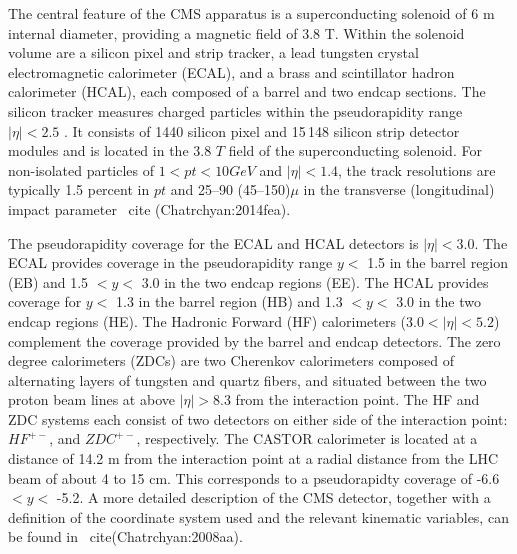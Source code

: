 The central feature of the CMS apparatus is a superconducting solenoid of 6 m internal diameter, providing a magnetic field of 3.8 T. Within the solenoid volume are a silicon pixel and strip tracker, a lead tungsten crystal electromagnetic calorimeter (ECAL), and a brass and scintillator hadron calorimeter (HCAL), each composed of a barrel and two endcap sections. The silicon tracker measures charged particles within the pseudorapidity range $|\eta| < 2.5$ . It consists of 1440 silicon pixel and 15\,148 silicon strip detector modules and is located in the 3.8 $T$ field of the superconducting solenoid. For non-isolated particles of $1 < pt < 10 GeV$ and $|\eta| < 1.4$, the track resolutions are typically 1.5 percent in $pt$ and 25--90 (45--150)$\mu$ in the transverse (longitudinal) impact parameter~ cite (Chatrchyan:2014fea). 


The pseudorapidity coverage for the ECAL and HCAL detectors is $|\eta|< 3.0$. The ECAL provides coverage in the pseudorapidity range $y < $ 1.5 in the barrel region (EB) and 1.5 $< y <$ 3.0 in the two endcap regions (EE). The HCAL provides coverage for $y <$ 1.3 in the barrel region (HB) and 1.3 $< y< $ 3.0 in the two endcap regions (HE). The Hadronic Forward (HF) calorimeters ($3.0<|\eta| < 5.2 $) complement the coverage provided by the barrel and endcap detectors. The zero degree calorimeters (ZDCs) are two Cherenkov calorimeters composed of alternating layers of tungsten and quartz fibers, and situated between the two proton beam lines at above $|\eta|>8.3$ from the interaction point. The HF and ZDC systems each consist of two detectors on either side of the interaction point: $HF^{+-}$, and $ZDC^{+-}$, respectively. The CASTOR calorimeter is located at a distance of 14.2 m from the interaction point at a radial distance from the LHC beam of about 4 to 15 cm. This corresponds to a pseudorapidty coverage of -6.6 $< y <$ -5.2. A more detailed description of the CMS detector, together with a definition of the coordinate system used and the relevant kinematic variables, can be found in~ cite(Chatrchyan:2008aa).

